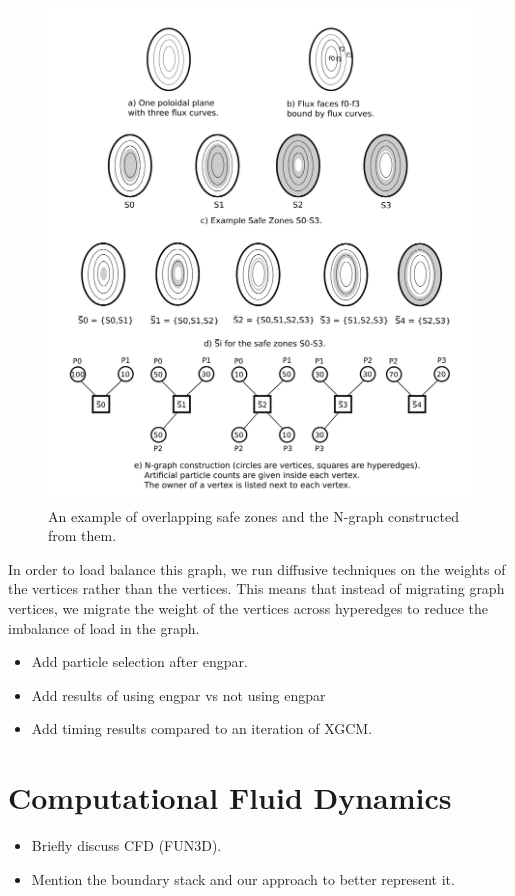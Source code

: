 \documentclass[conference]{IEEEtran}
\begin{document}
\begin{figure}[!ht]
  \centering
  \includegraphics[width=.4\textwidth]{../figures/xgcm_ngraph_construction.png}
  \caption{An example of overlapping safe zones and the N-graph constructed from them.}
  \label{fig:sbars}
\end{figure}

In order to load balance this graph, we run diffusive techniques on the weights of the vertices
rather than the vertices. This means that instead of migrating graph vertices, we migrate the
weight of the vertices across hyperedges to reduce the imbalance of load in the graph.

\begin{itemize}
\item Add particle selection after engpar.
\item Add results of using engpar vs not using engpar
\item Add timing results compared to an iteration of XGCM.
\end{itemize}

\section{Computational Fluid Dynamics}

\begin{itemize}
\item Briefly discuss CFD (FUN3D).
\item Mention the boundary stack and our approach to better represent it.
\end{itemize}
\end{document}
